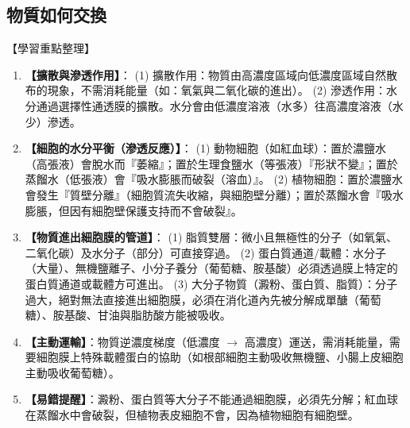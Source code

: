 \documentclass[11pt,a4paper]{article}
\begin{document}
\subsection{物質如何交換}
\begin{learningpoints}{【學習重點整理】}
\begin{enumerate}[label=\arabic*.]
  \item \textbf{【擴散與滲透作用】}：
  (1) 擴散作用：物質由高濃度區域向低濃度區域自然散布的現象，不需消耗能量（如：氧氣與二氧化碳的進出）。
  (2) 滲透作用：水分通過選擇性通透膜的擴散。水分會由低濃度溶液（水多）往高濃度溶液（水少）滲透。
  \item \textbf{【細胞的水分平衡（滲透反應）】}：
  (1) 動物細胞（如紅血球）：置於濃鹽水（高張液）會脫水而『萎縮』；置於生理食鹽水（等張液）『形狀不變』；置於蒸餾水（低張液）會『吸水膨脹而破裂（溶血）』。
  (2) 植物細胞：置於濃鹽水會發生『質壁分離』（細胞質流失收縮，與細胞壁分離）；置於蒸餾水會『吸水膨脹，但因有細胞壁保護支持而不會破裂』。
  \item \textbf{【物質進出細胞膜的管道】}：
  (1) 脂質雙層：微小且無極性的分子（如氧氣、二氧化碳）及水分子（部分）可直接穿過。
  (2) 蛋白質通道/載體：水分子（大量）、無機鹽離子、小分子養分（葡萄糖、胺基酸）必須透過膜上特定的蛋白質通道或載體方可進出。
  (3) 大分子物質（澱粉、蛋白質、脂質）：分子過大，絕對無法直接進出細胞膜，必須在消化道內先被分解成單醣（葡萄糖）、胺基酸、甘油與脂肪酸方能被吸收。
  \item \textbf{【主動運輸】}：物質逆濃度梯度（低濃度 $\rightarrow$ 高濃度）運送，需消耗能量，需要細胞膜上特殊載體蛋白的協助（如根部細胞主動吸收無機鹽、小腸上皮細胞主動吸收葡萄糖）。
  \item \textbf{【易錯提醒】}：澱粉、蛋白質等大分子不能通過細胞膜，必須先分解；紅血球在蒸餾水中會破裂，但植物表皮細胞不會，因為植物細胞有細胞壁。
\end{enumerate}
\end{learningpoints}
\end{document}
